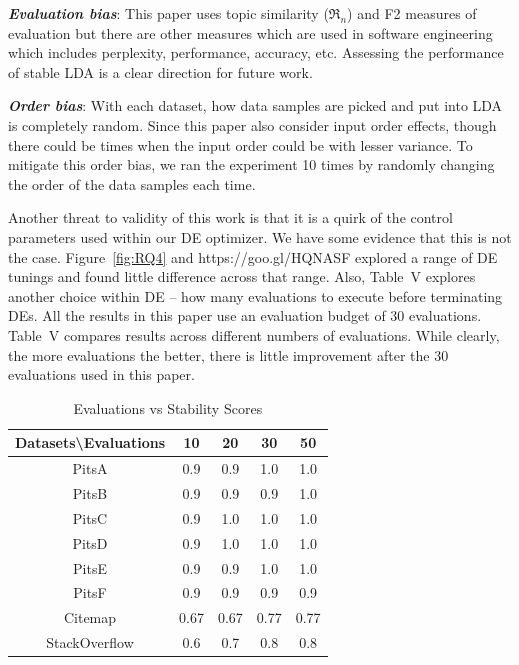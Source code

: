 \documentclass[twocolumn,5p,sort&compress]{elsarticle}
\theoremstyle{break}
\begin{document}
\textbf{\textit{Evaluation bias}}: This paper uses topic similarity ($\Re_n$) and F2 measures of evaluation but there are other measures which are used in software engineering which
includes perplexity, performance, accuracy, etc. Assessing
the performance of stable LDA is a clear direction for future work.

\textbf{\textit{Order bias}}: With each dataset, how data samples are picked and put into LDA is completely random. Since this paper also consider input order effects, though there could be times when the input order could be with lesser variance. To mitigate this order bias, we ran the experiment 10 times by randomly changing the order of the data samples each time.


Another threat to validity of this work is that it is a quirk of the control
parameters used within our DE optimizer.
We have some evidence that this is not the case.
Figure~\ref{fig:RQ4} and https://goo.gl/HQNASF explored a range of DE tunings and found
little difference across that range. Also, Table~V explores another choice within DE -- how
many evaluations to execute before terminating DEs. All the results in this paper use an
evaluation budget of 30 evaluations. Table~V
compares results across different numbers of evaluations. While clearly,
the more evaluations the better, there is little improvement after the
30 evaluations used in this paper.

\begin{table}[!htbp]
\scriptsize
\begin{center}
\begin{tabular}{|c|c|c|c|c|}
\hline 
\textbf{Datasets\textbackslash Evaluations} & \textbf{10} & \textbf{20} & \textbf{30} &
\textbf{50} \\[0.5ex]
\hline
PitsA & 0.9 & 0.9 & 1.0 & 1.0\\ 
\hline
PitsB & 0.9 & 0.9 & 0.9 & 1.0 \\
\hline
PitsC & 0.9 & 1.0 & 1.0 & 1.0\\ 
\hline
PitsD & 0.9 & 1.0 & 1.0 & 1.0\\ 
\hline
PitsE & 0.9 & 0.9 & 1.0 & 1.0\\
\hline
PitsF & 0.9 & 0.9 & 0.9 & 0.9\\
\hline
Citemap & 0.67 & 0.67 & 0.77 & 0.77\\
\hline
StackOverflow & 0.6 & 0.7 & 0.8 & 0.8\\
\hline
\end{tabular}
\end{center}
\caption{Evaluations vs Stability Scores}
\label{tb:tablename1}
\end{table}
\end{document}
